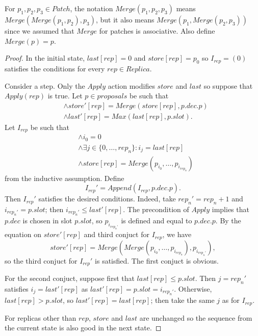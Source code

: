 \documentclass[12pt,a4paper,en]{pracamgr}
\begin{document}
For $p_1, p_2, p_3 \in Patch$, the notation $Merge(p_1, p_2, p_3)$ means $Merge(Merge(p_1, p_2), p_3)$, but it also means $Merge(p_1, Merge(p_2, p_3))$ since we assumed that $Merge$ for patches is associative. Also define $Merge(p) = p$.
\begin{proof}
    In the initial state, $last[rep] = 0$ and $store[rep] = p_0$ so $I_{rep} = (0)$ satisfies the conditions for every $rep \in Replica$.

    Consider a step. Only the $Apply$ action modifies $store$ and $last$ so suppose that $Apply(rep)$ is true. Let $p \in proposals$ be such that
    \begin{align*}
        & \land store'[rep] = Merge(store[rep], p.dec.p)\\
        & \land last'[rep] = Max(last[rep], p.slot).
    \end{align*}
    Let $I_{rep}$ be such that
    \begin{align*}
        & \land i_0 = 0\\
        & \land \exists j \in \{0, \dots, rep_n\}: i_j = last[rep]\\
        & \land store[rep] = Merge(p_{i_0}, \dots, p_{i_{rep_n}})
    \end{align*}
    from the inductive assumption. Define
    $$ I_{rep}' = Append(I_{rep}, p.dec.p). $$
    Then $I_{rep}'$ satisfies the desired conditions. Indeed, take $rep_n' = rep_n + 1$ and $i_{rep_n'} = p.slot$; then $i_{rep_n'} \le last'[rep]$. The precondition of $Apply$ implies that $p.dec$ is chosen in slot $p.slot$, so $p_{i_{rep_n'}}$ is defined and equal to $p.dec.p$. By the equation on $store'[rep]$ and third conjuct for $I_{rep}$, we have
    $$ store'[rep] = Merge(Merge(p_{i_0}, \dots, p_{i_{rep_n}}), p_{i_{rep_n'}}), $$
    so the third conjuct for $I_{rep}'$ is satisfied. The first conjuct is obvious.

    For the second conjuct, suppose first that $last[rep] \le p.slot$. Then $j = rep_n'$ satisfies $i_j = last'[rep]$ as $last'[rep] = p.slot = i_{rep_n'}$. Otherwise, $last[rep] > p.slot$, so $last'[rep] = last[rep]$; then take the same $j$ as for $I_{rep}$.

    For replicas other than $rep$, $store$ and $last$ are unchanged so the sequence from the current state is also good in the next state.
\end{proof}
\end{document}
